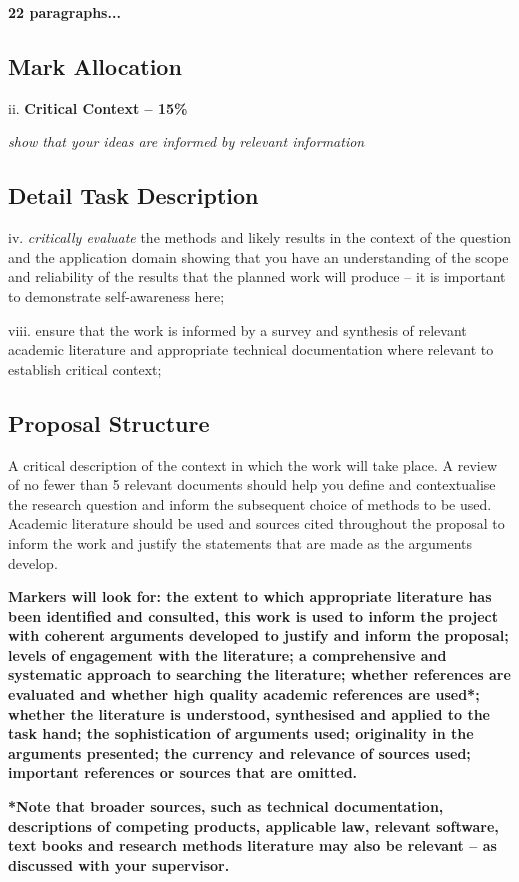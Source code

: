 \textbf{22 paragraphs...} 


\subsection{Mark Allocation}

ii. \textbf{Critical Context -- 15\%}

\textit{show that your ideas are informed by relevant information}

\subsection{Detail Task Description} 
iv. \textit{critically evaluate} the methods and likely results in the context of the question and the application domain showing that you have an understanding of the scope and reliability of the results that the planned work will produce -- it is important to demonstrate self-awareness here;

viii. ensure that the work is informed by a survey and synthesis of relevant academic literature and appropriate technical documentation where relevant to establish critical context;

\subsection{Proposal Structure}
A critical description of the context in which the work will take place. A review of no fewer than 5 relevant documents should help you define and contextualise the research question and inform the subsequent choice of methods to be used. Academic literature should be used and sources cited throughout the proposal to inform the work and justify the statements that are made as the arguments develop.

\textbf{Markers will look for: the extent to which appropriate literature has been identified and consulted, this work is used to inform the project with coherent arguments developed to justify and inform the proposal; levels of engagement with the literature; a comprehensive and systematic approach to searching the literature; whether references are evaluated and whether high quality academic references are used*; whether the literature is understood, synthesised and applied to the task hand; the sophistication of arguments used; originality in the arguments presented; the currency and relevance of sources used; important references or sources that are omitted.}

\textbf{*Note that broader sources, such as technical documentation, descriptions of competing products, applicable law, relevant software, text books and research methods literature may also be relevant -- as discussed with your supervisor.}


